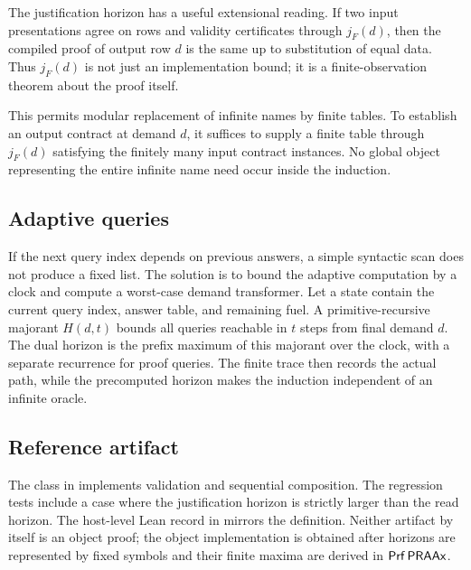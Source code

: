 The justification horizon has a useful extensional reading.  If two input
presentations agree on rows and validity certificates through \(j_F(d)\), then the
compiled proof of output row \(d\) is the same up to substitution of equal data.  Thus
\(j_F(d)\) is not just an implementation bound; it is a finite-observation theorem
about the proof itself.

This permits modular replacement of infinite names by finite tables.  To establish an
output contract at demand \(d\), it suffices to supply a finite table through
\(j_F(d)\) satisfying the finitely many input contract instances.  No global object
representing the entire infinite name need occur inside the induction.

\subsection{Adaptive queries}

If the next query index depends on previous answers, a simple syntactic scan does not
produce a fixed list.  The solution is to bound the adaptive computation by a clock and
compute a worst-case demand transformer.  Let a state contain the current query index,
answer table, and remaining fuel.  A primitive-recursive majorant \(H(d,t)\) bounds
all queries reachable in \(t\) steps from final demand \(d\).  The dual horizon is the
prefix maximum of this majorant over the clock, with a separate recurrence for proof
queries.  The finite trace then records the actual path, while the precomputed horizon
makes the induction independent of an infinite oracle.

\subsection{Reference artifact}

The class  in  implements validation and
sequential composition.  The regression tests include a case where the justification
horizon is strictly larger than the read horizon.  The host-level Lean record in
 mirrors the definition.  Neither artifact by itself is
an object proof; the object implementation is obtained after horizons are represented
by fixed  symbols and their finite maxima are derived in \(\mathsf{Prf}\,\mathsf{PRAAx}\).
